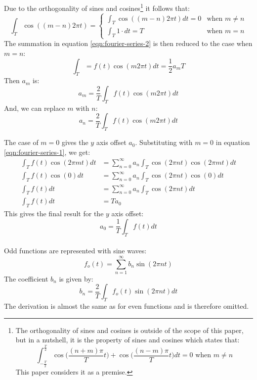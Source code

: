 \documentclass{article}
\begin{document}
Due to the orthogonality of sines and cosines\footnote{The orthogonality of 
	sines and cosines is outside of the scope of this paper, but in a nutshell,
	it is the property of sines and cosines which states that:
	\[
		\int_{-\frac{T}{2}}^{\frac{T}{2}} \cos \bigg(\frac{(n + m) \pi}{T} t
		\bigg) + \cos \bigg(\frac{(n - m) \pi}{T} t \bigg) dt = 0 \text{ when }
		m \neq n
	\]
This paper considers it as a premise.} it follows that:
\[
	\int_{T} \cos( (m - n) 2 \pi t) = 
	\begin{cases}
		\int_{T} \cos ( (m -n) 2 \pi t) dt = 0 & \text{when } m \neq n \\
		\int_{T} 1 \cdot dt = T & \text{when } m = n
	\end{cases}
\]
The summation in equation \ref{eqn:fourier-series-2} is then reduced to the case
when $m = n$:
$$\int_T = f(t) \cos(m 2 \pi t) dt = \frac{1}{2} a_m T$$
Then $a_m$ is:
\begin{equation*}
	a_m = \frac{2}{T} \int_T f(t) \cos(m 2 \pi t) dt
\end{equation*}
And, we can replace $m$ with $n$:
\begin{equation}
	a_n = \frac{2}{T} \int_T f(t) \cos(m 2 \pi t) dt
	\label{eqn:fourier-series-amp}
\end{equation}

The case of $m = 0$ gives the $y$ axis offset $a_0$. Substituting with $m = 0$
in equation \ref{eqn:fourier-series-1}, we get:
$$
\begin{aligned}
\int_{T} f(t) \cos(2 \pi m t) dt &= 
\sum^{\infty}_{n=0} a_n \int_{T} \cos(2 \pi n t) \cos(2 \pi m t) dt \\ 
\int_T f(t) \cos(0) dt &= \sum^{\infty}_{n=0} a_n \int_T \cos(2 \pi n t) \cos(0) dt \\
\int_T f(t) dt &= \sum^{\infty}_{n=0} a_n \int_T \cos(2 \pi n t) dt \\
\int_T f(t) dt &= T a_0
\end{aligned}$$
This gives the final result for the $y$ axis offset:
\begin{equation}
	a_0 = \frac{1}{T} \int_T f(t) dt
	\label{eqn:fourier-series-yoffset}
\end{equation}

\paragraph*{}
Odd functions are represented with sine waves:
$$f_o(t) = \sum^{\infty}_{n=1} b_n \sin(2 \pi n t)$$
The coefficient $b_n$ is given by:
$$b_n = \frac{2}{T}\int_T f_o(t) \sin(2 \pi n t) dt$$
The derivation is almost the same as for even functions and is therefore
omitted.
\end{document}
